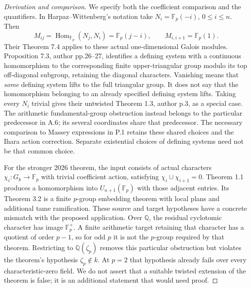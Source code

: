 \begin{proof}[Derivation and comparison]
We specify both the coefficient comparison and the quantifiers.
In Harpaz--Wittenberg's notation take
$N_i=\mathbb F_p(-i)$, $0\le i\le n$.  Then
\[
 M_{ij}=\operatorname{Hom}_{\mathbb F_p}(N_j,N_i)
       =\mathbb F_p(j-i),\qquad M_{i,i+1}=\mathbb F_p(1).
\]
Their Theorem 7.4 applies to these actual one-dimensional Galois
modules.  Proposition 7.3, author pp.26--27, identifies a defining
system with a continuous homomorphism to the corresponding finite
upper-triangular group modulo its top off-diagonal subgroup, retaining the
diagonal characters.  Vanishing means that \emph{some} defining
system lifts to the full triangular group.  It does not say that
the homomorphism belonging to an already specified defining system
lifts.  Taking every $N_i$ trivial gives their untwisted Theorem 1.3,
author p.3, as a special case.  The arithmetic fundamental-group
obstruction instead belongs to the particular predecessor in A.6;
its several coordinates share that predecessor.  The necessary
comparison to Massey expressions in P.1 retains these shared choices
and the Ihara action correction.  Separate existential choices of
defining systems need not be that common choice.

For the stronger 2026 theorem, the input consists of actual
characters $\chi_i:G_k\to\mathbb F_p$ with trivial coefficient
action, satisfying $\chi_i\cup\chi_{i+1}=0$.  Theorem 1.1 produces
a homomorphism into $U_{n+1}(\mathbb F_p)$ with those adjacent
entries.  Its Theorem 3.2 is a finite $p$-group embedding theorem
with local plans and additional tame ramification.  These source
and target hypotheses have a concrete mismatch with the proposed
application.  Over $\mathbb Q$, the residual cyclotomic character
has image $\mathbb F_p^\times$.  A finite arithmetic target retaining
that character has a quotient of order $p-1$, so for odd $p$ it is
not the $p$-group required by that theorem.  Restricting to
$\mathbb Q(\zeta_p)$ removes this particular obstruction but violates
the theorem's hypothesis $\zeta_p\notin k$.  At $p=2$ that hypothesis
already fails over every characteristic-zero field.  We do not
assert that a suitable twisted extension of the theorem is false;
it is an additional statement that would need proof.


\end{proof}
